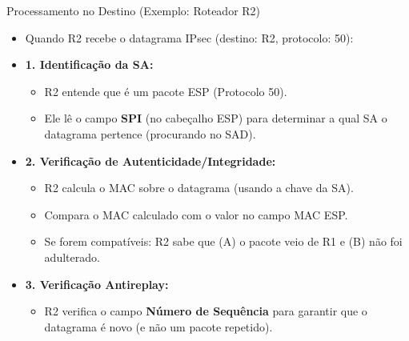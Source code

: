 \begin{frame}{Processamento no Destino (Exemplo: Roteador R2)}
    \begin{itemize}
        \item Quando R2 recebe o datagrama IPsec (destino: R2, protocolo: 50):

        \item \textbf{1. Identificação da SA:}
              \begin{itemize}
                  \item R2 entende que é um pacote ESP (Protocolo 50).
                  \item Ele lê o campo \textbf{SPI} (no cabeçalho ESP) para determinar a qual SA o datagrama pertence (procurando no SAD).
              \end{itemize}

        \item \textbf{2. Verificação de Autenticidade/Integridade:}
              \begin{itemize}
                  \item R2 calcula o MAC sobre o datagrama (usando a chave da SA).
                  \item Compara o MAC calculado com o valor no campo MAC ESP.
                  \item Se forem compatíveis: R2 sabe que (A) o pacote veio de R1 e (B) não foi adulterado.
              \end{itemize}

        \item \textbf{3. Verificação Antireplay:}
              \begin{itemize}
                  \item R2 verifica o campo \textbf{Número de Sequência} para garantir que o datagrama é novo (e não um pacote repetido).
              \end{itemize}
    \end{itemize}
\end{frame}
